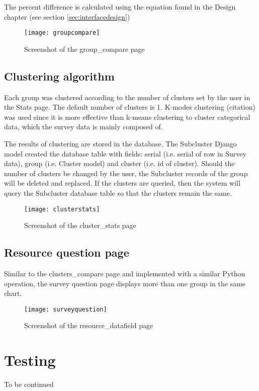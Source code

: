 The percent difference is calculated using the equation found in the Design chapter (see section \ref{sec:interfacedesign})

\begin{figure}[h]
\centering
\texttt{[image: groupcompare]}
\caption{Screenshot of the group\_compare page}
\label{fig:groupcompare}
\end{figure}

\subsection{Clustering algorithm}

Each group was clustered according to the number of clusters set by the user in the Stats page. The default number of clusters is 1. K-modes clustering (citation) was used since it is more effective than k-means clustering to cluster categorical data, which the survey data is mainly composed of.\par

The results of clustering are stored in the database. The Subcluster Django model created the database table with fields: serial (i.e. serial of row in Survey data), group (i.e. Cluster model) and cluster (i.e. id of cluster). Should the number of clusters be changed by the user, the Subcluster records of the group will be deleted and replaced. If the clusters are queried, then the system will query the Subcluster database table so that the clusters remain the same.

\begin{figure}[h]
\centering
\texttt{[image: clusterstats]}
\caption{Screenshot of the cluster\_stats page}
\label{fig:clustestats}
\end{figure}


\subsection{Resource question page}
Similar to the clusters\_compare page and implemented with a similar Python operation, the survey question page displays more than one group in the same chart. 

\begin{figure}[h]
\centering
\texttt{[image: surveyquestion]}
\caption{Screenshot of the resource\_datafield page}
\label{fig:surveyquestion}
\end{figure}

\section{Testing}
To be continued